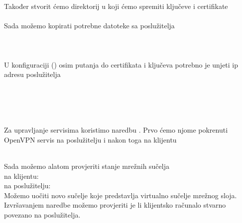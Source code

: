         \noindent
        Također stvorit ćemo direktorij u koji ćemo spremiti ključeve i
        certifikate \\

        \noindent
        \\

        \noindent
        Sada možemo kopirati potrebne datoteke sa poslužitelja \\

        \noindent
         \\
         \\
        \\

        \noindent
        U konfiguraciji () osim putanja do certifikata i
        ključeva potrebno je unjeti ip adresu poslužitelja

        \noindent
         \\
         \\
         \\
         \\

        Za upravljanje servisima koristimo naredbu . Prvo ćemo
        njome pokrenuti OpenVPN servis na poslužitelju i nakon toga na klijentu

        \noindent
         \\

        \noindent
        Sada možemo alatom  provjeriti stanje mrežnih sučelja \\
        na klijentu: \\
        na poslužitelju: \\

        Možemo uočiti novo sučelje  koje predstavlja virtualno
        sučelje mrežnog sloja. Izvršavanjem naredbe  možemo provjeriti je
        li klijentsko računalo stvarno povezano na poslužitelja. 

        \noindent

